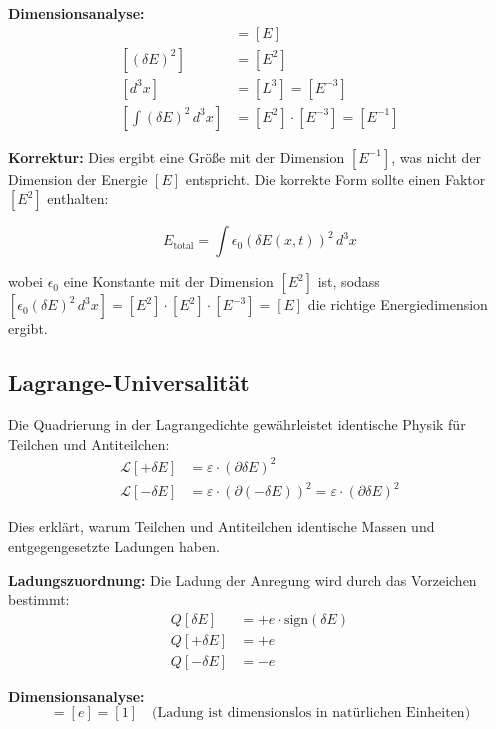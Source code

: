 \documentclass[12pt,a4paper]{report}
\begin{document}
\textbf{Dimensionsanalyse:}
\begin{align}
	[\delta E] &= [E] \\
	[(\delta E)^2] &= [E^2] \\
	[d^3x] &= [L^3] = [E^{-3}] \\
	[\int (\delta E)^2 \, d^3x] &= [E^2] \cdot [E^{-3}] = [E^{-1}]
\end{align}

\textbf{Korrektur:} Dies ergibt eine Größe mit der Dimension $[E^{-1}]$, was nicht der Dimension der Energie $[E]$ entspricht. Die korrekte Form sollte einen Faktor $[E^2]$ enthalten:

\begin{equation}
	E_{\text{total}} = \int \epsilon_0 (\delta E(x,t))^2 \, d^3x
\end{equation}

wobei $\epsilon_0$ eine Konstante mit der Dimension $[E^2]$ ist, sodass $[\epsilon_0 (\delta E)^2 \, d^3x] = [E^2] \cdot [E^2] \cdot [E^{-3}] = [E]$ die richtige Energiedimension ergibt.
	\subsection{Lagrange-Universalität}
	\label{subsec:lagrangian_universality}
	
	Die Quadrierung in der Lagrangedichte gewährleistet identische Physik für Teilchen und Antiteilchen:
	\begin{align}
		\mathcal{L}[+\delta E] &= \varepsilon \cdot (\partial \delta E)^2 \\
		\mathcal{L}[-\delta E] &= \varepsilon \cdot (\partial (-\delta E))^2 = \varepsilon \cdot (\partial \delta E)^2
	\end{align}
	
	Dies erklärt, warum Teilchen und Antiteilchen identische Massen und entgegengesetzte Ladungen haben.
	
	\textbf{Ladungszuordnung:} Die Ladung der Anregung wird durch das Vorzeichen bestimmt:
	\begin{align}
		Q[\delta E] &= +e \cdot \text{sign}(\delta E) \\
		Q[+\delta E] &= +e \\
		Q[-\delta E] &= -e
	\end{align}
	
	\textbf{Dimensionsanalyse:}
	\begin{equation}
		[Q] = [e] = [1] \quad \text{(Ladung ist dimensionslos in natürlichen Einheiten)}
	\end{equation}
	
\end{document}
